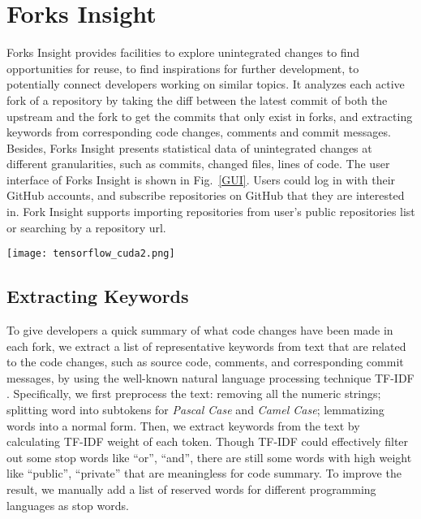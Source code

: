 \section{Forks Insight}

Forks Insight provides facilities to explore unintegrated changes to find opportunities for reuse, to find inspirations for further development, to potentially connect developers working on similar topics.
%
It analyzes each active fork of a repository by taking the diff between the latest commit of both the upstream and the fork to get the commits that only exist in forks, and extracting keywords from corresponding code changes, comments and commit messages.
%
Besides, Forks Insight presents statistical data of unintegrated changes at different granularities, such as commits, changed files, lines of code. The user interface of Forks Insight is shown in Fig.~\ref{GUI}.
%
Users could log in with their GitHub accounts, and subscribe repositories on GitHub that they are interested in. Fork Insight supports importing repositories from user's public repositories list or searching by a repository url.

\begin{figure*}[ht]
\begin{centering}
\texttt{[image: tensorflow\_cuda2.png]}
\caption{User Interface of Forks Insight. This example shows searching ``cuda'' in repository of \emph{tensorflow/tensorflow}.}
\vspace{-3pt}
\label{GUI}
\end{centering}
\end{figure*}

\subsection{Extracting Keywords}
To give developers a quick summary of what code changes have been made in each fork, we extract a list of representative keywords from text that are related to the code changes, such as source code, comments, and corresponding commit messages, by using the well-known natural language processing technique TF-IDF \cite{salton1988term}. Specifically, we first preprocess the text: removing all the numeric strings; splitting word into subtokens for \emph{Pascal Case} and \emph{Camel Case}; lemmatizing words into a normal form. Then, we extract keywords from the text by calculating TF-IDF weight of each token. Though TF-IDF could effectively filter out some stop words like ``or'', ``and'', there are still some words with high weight like ``public'', ``private'' that are meaningless for code summary. To improve the result, we manually add a list of  reserved words for different programming languages as stop words.


